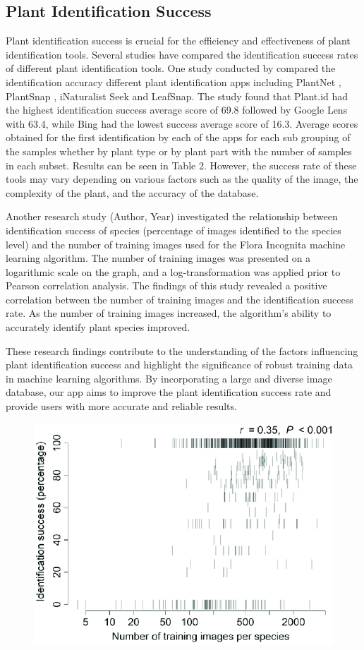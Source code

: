 \documentclass[conference]{IEEEtran}
\begin{document}
\subsection{Plant Identification Success}
Plant identification success is crucial for the efficiency and effectiveness of plant identification tools.
Several studies have compared the identification success rates of different plant identification tools.
One study conducted by \cite{AOBP} compared the identification accuracy  different plant identification apps including PlantNet , PlantSnap , iNaturalist Seek and LeafSnap.
The study found that Plant.id had the highest identification success average score of 69.8 followed by Google Lens with 63.4, while Bing had the lowest success average score of 16.3. Average scores obtained for the first identification by each of the apps for each sub grouping of the samples whether by plant type or by plant part with the number of samples in each subset. Results can be seen in Table 2.
However, the success rate of these tools may vary depending on various factors such as the quality of the image, the complexity of the plant, and the accuracy of the database.

Another research study (Author, Year) investigated the relationship between identification success of species (percentage of images identified to the species level) and the number of training images used for the Flora Incognita machine learning algorithm. The number of training images was presented on a logarithmic scale on the graph, and a log-transformation was applied prior to Pearson correlation analysis. The findings of this study revealed a positive correlation between the number of training images and the identification success rate. As the number of training images increased, the algorithm's ability to accurately identify plant species improved. 

These research findings contribute to the understanding of the factors influencing plant identification success and highlight the significance of robust training data in machine learning algorithms. By incorporating a large and diverse image database, our app aims to improve the plant identification success rate and provide users with more accurate and reliable results.

\begin{figure}[H]
\centerline{\includegraphics[width=0.48 \textwidth]{images/eeeee.png}}
\end{figure}
\end{document}
